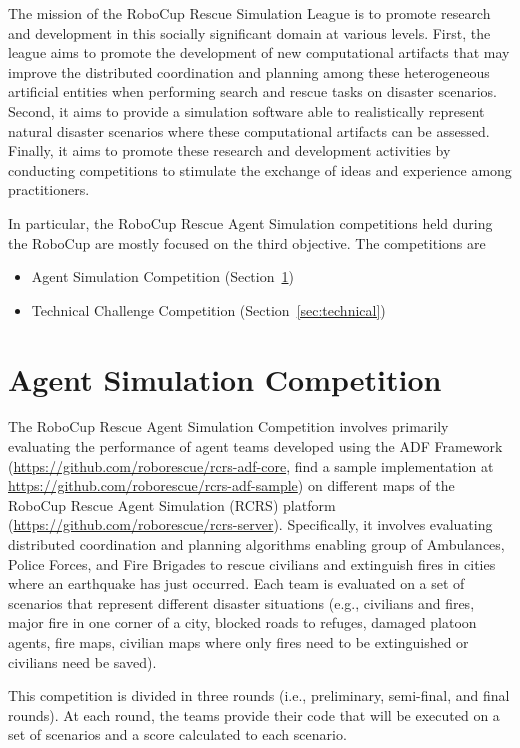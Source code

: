 \documentclass{article}
\begin{document}
The mission of the RoboCup Rescue Simulation League is to promote research and development in this socially significant domain at various levels. First, the league aims to promote the development of new computational artifacts that may improve the distributed coordination and planning among these heterogeneous artificial entities when performing search and rescue tasks on disaster scenarios. Second, it aims to provide a simulation software able to realistically represent natural disaster scenarios where these computational artifacts can be assessed. Finally, it aims to promote these research and development activities by conducting competitions to stimulate the exchange of ideas and experience among practitioners.

In particular, the RoboCup Rescue Agent Simulation competitions held during the RoboCup are mostly focused on the third objective. The competitions are
\begin{itemize}
\item Agent Simulation Competition (Section~\ref{sec:agent})
\item Technical Challenge Competition (Section~\ref{sec:technical})
\end{itemize}
\section{Agent Simulation Competition}
\label{sec:agent}
The RoboCup Rescue Agent Simulation Competition involves primarily evaluating the performance of agent teams developed using the ADF Framework (\url{https://github.com/roborescue/rcrs-adf-core}, find a sample implementation at \url{https://github.com/roborescue/rcrs-adf-sample}) on different maps of the RoboCup Rescue Agent Simulation (RCRS) platform (\url{https://github.com/roborescue/rcrs-server}). Specifically, it involves evaluating distributed coordination and planning algorithms enabling group of Ambulances, Police Forces, and Fire Brigades to rescue civilians and extinguish fires in cities where an earthquake has just occurred. Each team is evaluated on a set of scenarios that represent different disaster situations (e.g., civilians and fires, major fire in one corner of a city, blocked roads to refuges, damaged platoon agents, fire maps, civilian maps where only fires need to be extinguished or civilians need be saved).

This competition is divided in three rounds (i.e., preliminary, semi-final, and final rounds). At each round, the teams provide their code that will be executed on a set of scenarios and a score calculated to each scenario.
\end{document}
